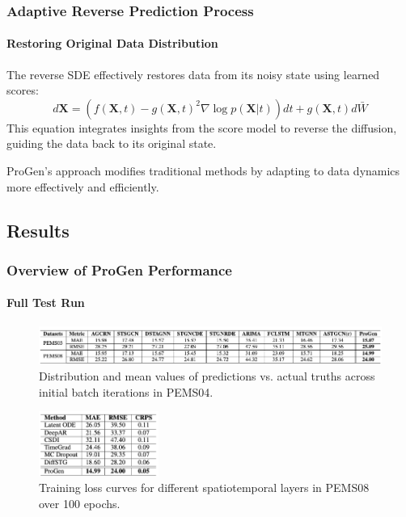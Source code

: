 \documentclass[light]{lutbeamer} %
\begin{document}
\begin{frame}
    \frametitle{Adaptive Reverse Prediction Process}
    \framesubtitle{Restoring Original Data Distribution}

    The reverse SDE effectively restores data from its noisy state using learned scores:
    \begin{equation}
        d\mathbf{X} = (f(\mathbf{X}, t) - g(\mathbf{X}, t)^2 \nabla \log p(\mathbf{X}|t))dt + g(\mathbf{X}, t)d\bar{W}
    \end{equation}
    This equation integrates insights from the score model to reverse the diffusion, guiding the data back to its original state.

    ProGen's approach modifies traditional methods by adapting to data dynamics more effectively and efficiently.
\end{frame}

\subsection{Results}
\begin{frame}
    \frametitle{Overview of ProGen Performance}
    \framesubtitle{Full Test Run}

    \begin{figure}[ht]
        \centering
        \includegraphics[width=\textwidth]{figures/det_full_tab.png}
        \caption{Distribution and mean values of predictions vs. actual truths across initial batch iterations in PEMS04.}
    \end{figure}

    \begin{figure}[htbp]
        \centering
        \includegraphics[width=0.35\textwidth]{figures/prob_full_tab.png}
        \caption{Training loss curves for different spatiotemporal layers in PEMS08 over 100 epochs.}
    \end{figure}
\end{frame}
\end{document}
